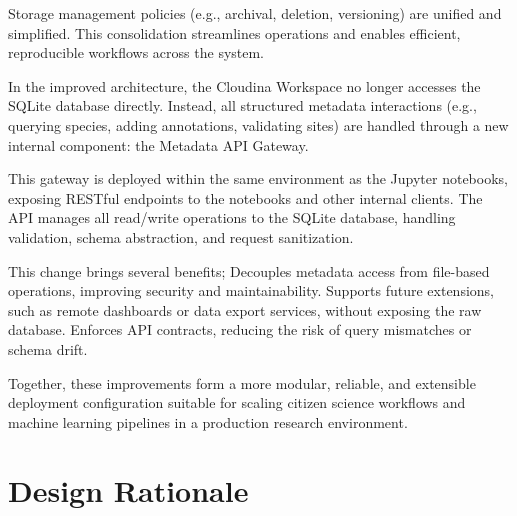 Storage management policies (e.g., archival, deletion, versioning) are unified and simplified. This consolidation streamlines operations and enables efficient, reproducible workflows across the system.

In the improved architecture, the Cloudina Workspace no longer accesses the SQLite database directly. Instead, all structured metadata interactions (e.g., querying species, adding annotations, validating sites) are handled through a new internal component: the Metadata API Gateway.

This gateway is deployed within the same environment as the Jupyter notebooks, exposing RESTful endpoints to the notebooks and other internal clients. The API manages all read/write operations to the SQLite database, handling validation, schema abstraction, and request sanitization.

This change brings several benefits; Decouples metadata access from file-based operations, improving security and maintainability. Supports future extensions, such as remote dashboards or data export services, without exposing the raw database. Enforces API contracts, reducing the risk of query mismatches or schema drift.

Together, these improvements form a more modular, reliable, and extensible deployment configuration suitable for scaling citizen science workflows and machine learning pipelines in a production research environment.


\section{Design Rationale}

